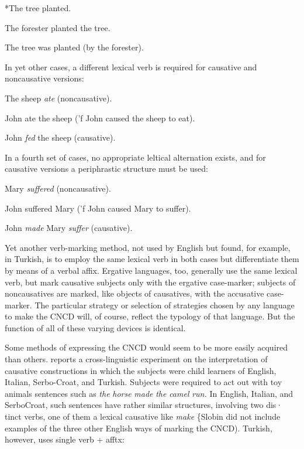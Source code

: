 \ea\label{ex:67}
 *The tree planted.
\glt
\z 


\ea\label{ex:68}
 The forester planted the tree.
\glt
\z

\ea\label{ex:69}
The tree was planted (by the forester).
\glt
\z


In yet other cases, a different lexical verb is required for causa\-tive and noncausative versions:

\ea\label{ex:70}
 The sheep \textit{ate} (noncausative).
\glt
\z

\ea\label{ex:71}
 John ate the sheep ('f John caused the sheep to eat).
\glt
\z

\ea\label{ex:72}
 John \textit{fed }the sheep (causative).
\glt
\z

In a fourth set of cases, no appropriate leltical alternation exists, and for causative versions a periphrastic structure must be used:

\ea\label{ex:73}
Mary \textit{suffered} (noncausative).
\glt
\z

\ea\label{ex:74}
John suffered Mary ('f John caused Mary to suffer).
\glt
\z


\ea\label{ex:75}
 John \textit{made} Mary \textit{suffer} (causative).
\glt
\z

Yet another verb-marking method, not used by English but found, for example, in Turkish, is to employ the same lexical verb in both cases but differentiate them by means of a verbal affix. Ergative languages, too, generally use the same lexical verb, but mark causative subjects only with the ergative case-marker; subjects of noncausatives are marked, like objects of causatives, with the accusative case-marker. The particular strategy or selection of strategies chosen by any lan\-guage to make the CNCD will, of course, reflect the typology of that language. But the function of all of these varying devices is identical.

Some methods of expressing the CNCD would seem to be more easily acquired than others. \citet{Slobin1978} reports a cross-linguistic experiment on the interpretation of causative constructions in which the subjects were child learners of English, Italian, Serbo-Croat, and Turkish. Subjects were required to act out with toy animals sentences such as \textit{the} \textit{horse} \textit{made} \textit{the} \textit{camel} \textit{run.} In English, Italian, and Serbo\-Croat, such sentences have rather similar structures, involving two dis· tinct verbs, one of them a lexical causative like \textit{make} \{Slobin did not
include examples of the three other English ways of marking the CNCD). Turkish, however, uses single verb + afftx:

